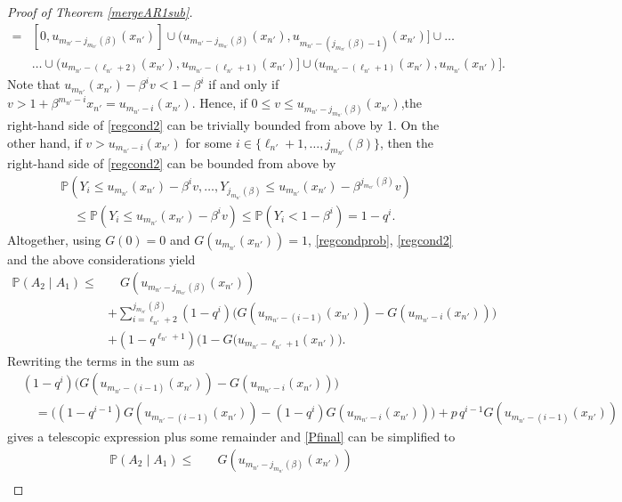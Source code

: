 \documentclass[12pt]{amsart}
\theoremstyle{definition}
\theoremstyle{remark}
\newcommand{\Pm}{{\mathbb P}}
\numberwithin{equation}{section}
\begin{document}
\begin{proof}[Proof of Theorem \ref{mergeAR1sub}]
\begin{align*}
[0,u_{m_{n'}}(x_{n'})] = & [0,u_{m_{n'}-j_{m_{n'}}(\beta)}(x_{n'})] \cup (u_{m_{n'}-j_{m_{n'}}(\beta)}(x_{n'}),u_{m_{n'}-(j_{m_{n'}}(\beta)-1)}(x_{n'})] \cup\ldots\\
& \ldots\cup  (u_{m_{n'}-(\ell_{n'}+2)}(x_{n'}),u_{m_{n'}-(\ell_{n'}+1)}(x_{n'})] \cup (u_{m_{n'}-(\ell_{n'}+1)}(x_{n'}),u_{m_{n'}}(x_{n'})].
\end{align*}
Note that $u_{m_{n'}}(x_{n'})-\beta^iv<1-\beta^i$ if and only if $v>1+\beta^{m_{n'}-i}x_{n'}=u_{m_{n'}-i}(x_{n'})$. Hence, if $0\leq v\leq u_{m_{n'}-j_{m_{n'}}(\beta)}(x_{n'})$,the right-hand side of \eqref{regcond2} can be trivially bounded from above by 1. On the other hand, if $v>u_{m_{n'}-i}(x_{n'})$ for some $i\in\{\ell_{n'}+1,\ldots,j_{m_{n'}}(\beta)\}$, then the right-hand side of \eqref{regcond2} can be bounded from above by
\begin{align*}
& \Pm(Y_{i}\leq u_{m_{n'}}(x_{n'})-\beta^iv,\ldots,Y_{j_{m_{n'}}(\beta)}\leq u_{m_{n'}}(x_{n'})-\beta^{j_{m_{n'}}(\beta)}v)\\
& \quad\leq\Pm(Y_{i}\leq u_{m_{n'}}(x_{n'})-\beta^iv)\leq\Pm(Y_{i}<1-\beta^i)=1-q^i.
\end{align*}
Altogether, using $G(0)=0$ and $G(u_{m_{n'}}(x_{n'}))=1$, \eqref{regcondprob}, \eqref{regcond2} and the above considerations yield
\begin{equation}\label{Pfinal}\begin{split}
\Pm(A_2\mid A_1)\leq & \quad G(u_{m_{n'}-j_{m_{n'}}(\beta)}(x_{n'}))\\
& +\sum_{i=\ell_{n'}+2}^{j_{m_{n'}}(\beta)}(1-q^i)\big(G(u_{m_{n'}-(i-1)}(x_{n'}))-G(u_{m_{n'}-i}(x_{n'}))\big)\\
& + (1-q^{\ell_{n'}+1})\big(1-G(u_{m_{n'}-\ell_{n'}+1}(x_{n'})\big).
\end{split}\end{equation}
Rewriting the terms in the sum as
\begin{align*}
& (1-q^i)\big(G(u_{m_{n'}-(i-1)}(x_{n'}))-G(u_{m_{n'}-i}(x_{n'}))\big)\\
& \quad =\big((1-q^{i-1})G(u_{m_{n'}-(i-1)}(x_{n'}))-(1-q^i)G(u_{m_{n'}-i}(x_{n'}))\big)+p\,q^{i-1}G(u_{m_{n'}-(i-1)}(x_{n'}))
\end{align*}
gives a telescopic expression plus some remainder and \eqref{Pfinal} can be simplified to
\begin{equation}\label{Pfinal1}\begin{split}
\Pm(A_2\mid A_1)\leq & \quad G(u_{m_{n'}-j_{m_{n'}}(\beta)}(x_{n'}))\\

\end{split}
\end{equation}
\end{proof}
\end{document}
